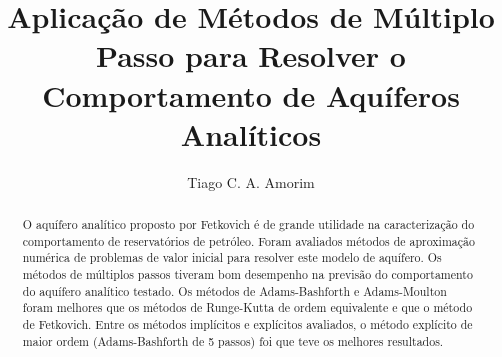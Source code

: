 \documentclass[final,5p]{elsarticle}
\numberwithin{equation}{section}
\begin{document}
\begin{frontmatter}



\title{Aplicação de Métodos de Múltiplo Passo para Resolver o Comportamento de Aquíferos Analíticos}


\author{Tiago C. A. Amorim}

\begin{abstract}

    O aquífero analítico proposto por Fetkovich é de grande utilidade na caracterização do comportamento de reservatórios de petróleo. Foram avaliados métodos de aproximação numérica de problemas de valor inicial para resolver este modelo de aquífero. Os métodos de múltiplos passos tiveram bom desempenho na previsão do comportamento do aquífero analítico testado. Os métodos de Adams-Bashforth e Adams-Moulton foram melhores que os métodos de Runge-Kutta de ordem equivalente e que o método de Fetkovich. Entre os métodos implícitos e explícitos avaliados, o método explícito de maior ordem (Adams-Bashforth de 5 passos) foi que teve os melhores resultados.


\end{abstract}
\end{frontmatter}
\end{document}
